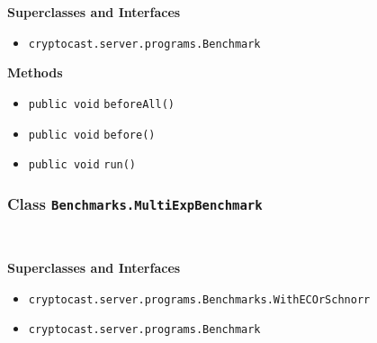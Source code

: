 \textbf{\sffamily Superclasses and Interfaces}
\begin{itemize}
\item \lstinline|cryptocast.server.programs.Benchmark|
\end{itemize}



\textbf{\sffamily Methods}
\begin{itemize}
\item \lstinline|public void| \lstinline|beforeAll|\lstinline|()| \\[-0.6em]




\item \lstinline|public void| \lstinline|before|\lstinline|()| \\[-0.6em]




\item \lstinline|public void| \lstinline|run|\lstinline|()| \\[-0.6em]




\end{itemize}

\subsubsection{Class \lstinline|Benchmarks.MultiExpBenchmark|}
 \\
\noindent\begin{minipage}[t]{5cm}
\vspace{0.3em}
\hspace*{2em}
\vspace{0.3em}
\end{minipage}



\textbf{\sffamily Superclasses and Interfaces}
\begin{itemize}
\item \lstinline|cryptocast.server.programs.Benchmarks.WithECOrSchnorr|
\item \lstinline|cryptocast.server.programs.Benchmark|
\end{itemize}



